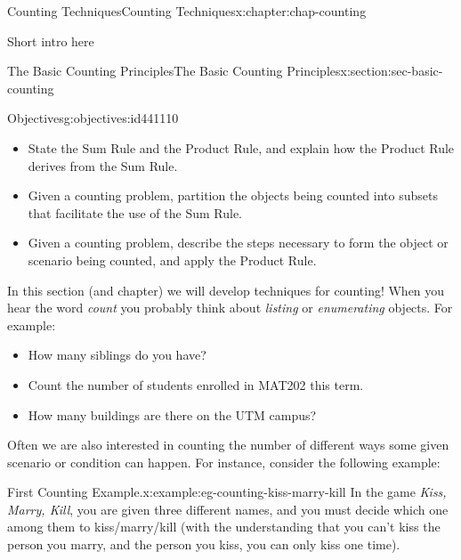 \documentclass[oneside,10pt,]{book}
\numberwithin{equation}{section}
\begin{document}
%
%
\typeout{************************************************}
\typeout{************************************************}
%
\begin{chapterptx}{Counting Techniques}{}{Counting Techniques}{}{}{x:chapter:chap-counting}
\begin{introduction}{}%
Short intro here%
\end{introduction}%
%
%
\typeout{************************************************}
\typeout{************************************************}
%
\begin{sectionptx}{The Basic Counting Principles}{}{The Basic Counting Principles}{}{}{x:section:sec-basic-counting}
\begin{objectives}{Objectives}{g:objectives:id441110}
%
\begin{itemize}[label=\textbullet]
\item{}State the Sum Rule and the Product Rule, and explain how the Product Rule derives from the Sum Rule.%
\item{}Given a counting problem, partition the objects being counted into subsets that facilitate the use of the Sum Rule.%
\item{}Given a counting problem, describe the steps necessary to form the object or scenario being counted, and apply the Product Rule.%
\end{itemize}
\end{objectives}
In this section (and chapter) we will develop techniques for counting! When you hear the word \emph{count} you probably think about \emph{listing} or \emph{enumerating} objects. For example:%
\begin{itemize}[label=\textbullet]
\item{}How many siblings do you have?%
\item{}Count the number of students enrolled in MAT202 this term.%
\item{}How many buildings are there on the UTM campus?%
\end{itemize}
Often we are also interested in counting the number of different ways some given scenario or condition can happen. For instance, consider the following example:%
\begin{example}{First Counting Example.}{x:example:eg-counting-kiss-marry-kill}%
In the game \emph{Kiss, Marry, Kill},\footnotemark{} you are given three different names, and you must decide which one among them to kiss\slash{}marry\slash{}kill (with the understanding that you can't kiss the person you marry, and the person you kiss, you can only kiss one time).%

\end{example}
\end{sectionptx}
\end{chapterptx}
\end{document}
